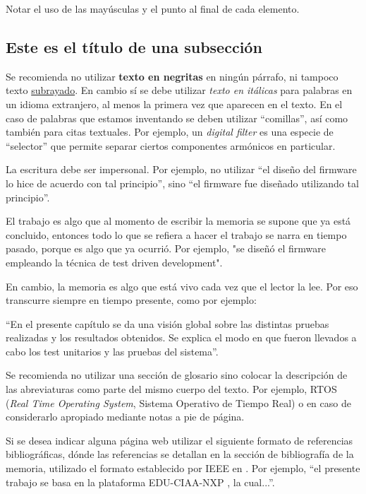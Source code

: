 Notar el uso de las mayúsculas y el punto al final de cada elemento.

\subsection{Este es el título de una subsección}
\label{subsec:ejemplo}

Se recomienda no utilizar \textbf{texto en negritas} en ningún párrafo, ni tampoco texto \underline{subrayado}. En cambio sí se debe utilizar \textit{texto en itálicas} para palabras en un idioma extranjero, al menos la primera vez que aparecen en el texto. En el caso de palabras que estamos inventando se deben utilizar ``comillas'', así como también para citas textuales. Por ejemplo, un \textit{digital filter} es una especie de ``selector'' que permite separar ciertos componentes armónicos en particular.

La escritura debe ser impersonal. Por ejemplo, no utilizar ``el diseño del firmware lo hice de acuerdo con tal principio'', sino ``el firmware fue diseñado utilizando tal principio''. 

El trabajo es algo que al momento de escribir la memoria se supone que ya está concluido, entonces todo lo que se refiera a hacer el trabajo se narra en tiempo pasado, porque es algo que ya ocurrió. Por ejemplo, "se diseñó el firmware empleando la técnica de test driven development".

En cambio, la memoria es algo que está vivo cada vez que el lector la lee. Por eso transcurre siempre en tiempo presente, como por ejemplo:

``En el presente capítulo se da una visión global sobre las distintas pruebas realizadas y los resultados obtenidos. Se explica el modo en que fueron llevados a cabo los test unitarios y las pruebas del sistema''.

Se recomienda no utilizar una sección de glosario sino colocar la descripción de las abreviaturas como parte del mismo cuerpo del texto. Por ejemplo, RTOS (\textit{Real Time Operating System}, Sistema Operativo de Tiempo Real) o en caso de considerarlo apropiado mediante notas a pie de página.

Si se desea indicar alguna página web utilizar el siguiente formato de referencias bibliográficas, dónde las referencias se detallan en la sección de bibliografía de la memoria, utilizado el formato establecido por IEEE en \citep{IEEE:citation}. Por ejemplo, ``el presente trabajo se basa en la plataforma EDU-CIAA-NXP \citep{CIAA}, la cual...''.

